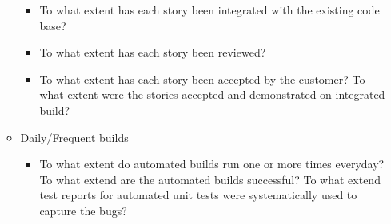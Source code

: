\begin{appendices}
\begin{itemize}
\begin{itemize}
\begin{itemize}
					\item To what extent has each story been integrated with the existing code base? 
					\item To what extent has each story been reviewed? 
					\item To what extent has each story been accepted by the customer? 
					\addition To what extent were the stories accepted and demonstrated on integrated build?
				\end{itemize}
			\item Daily/Frequent builds
				\begin{itemize}
					\item To what extent do automated builds run one or more times everyday?
					\addition To what extend are the automated builds successful?
					\addition To what extend test reports for automated unit tests were systematically used to capture the bugs?
				\end{itemize}
		\end{itemize}


\end{itemize}
\end{appendices}
